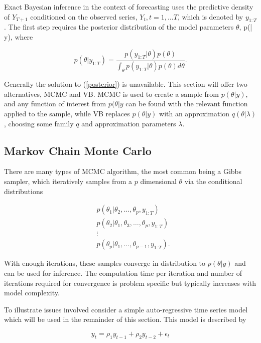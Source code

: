 \documentclass{article}\usepackage[]{graphicx}\usepackage[]{color}
\begin{document}
Exact Bayesian inference in the context of forecasting uses the predictive density of $Y_{T+1}$ conditioned on the observed series, $Y_{t}, t = 1, \dots T$, which is denoted by $y_{1:T}$. The first step requires the posterior distribution of the model parameters $\theta$, p(\theta | y), where

\begin{equation}
\label{posterior}
 p(\theta | y_{1:T}) = \frac{p(y_{1:T}|\theta)p(\theta)}{\int_\theta p(y_{1:T}|\theta)p(\theta) d\theta}.
\end{equation}

Generally the solution to (\ref{posterior}) is unavailable. This section will offer two alternatives, MCMC and VB.
MCMC is used to create a sample from $p(\theta | y)$, and any function of interest from $p(\theta | y$ can be found with the relevant function applied to the sample, while VB replaces $p(\theta | y)$ with an approximation $q(\theta | \lambda)$, choosing some family $q$ and approximation parameters $\lambda$.

\subsection{Markov Chain Monte Carlo}

There are many types of MCMC algorithm, the most common being a Gibbs sampler, which iteratively samples from a $p$ dimensional $\theta$ via the conditional distributions

\begin{align}
&p(\theta_1 | \theta_2, \dots, \theta_p, y_{1:T}) \nonumber \\
&p(\theta_2 | \theta_1, \theta_3, \dots, \theta_p, y_{1:T}) \nonumber \\
&\vdots \nonumber \\
&p(\theta_p | \theta_1, \dots, \theta_{p-1}, y_{1:T}). \nonumber
\end{align}

With enough iterations, these samples converge in distribution to $p(\theta | y)$ and can be used for inference. The computation time per iteration and number of iterations required for convergence is problem specific but typically increases with model complexity. 

To illustrate issues involved consider a simple auto-regressive time series model which will be used in the remainder of this section. This model is described by

\begin{equation}
\label{AR2}
y_t = \rho_1 y_{t-1} + \rho_2 y_{t-2} + \epsilon_t
\end{equation}
\end{document}
